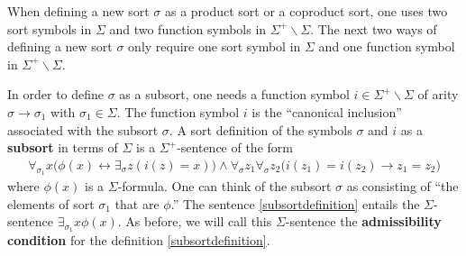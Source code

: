 When defining a new sort $\sigma$ as a product sort or a coproduct
sort, one uses two sort symbols in $\Sigma$ and two function symbols
in $\Sigma^+\backslash\Sigma$. The next two ways of defining a new
sort $\sigma$ only require one sort symbol in $\Sigma$ and one
function symbol in $\Sigma^+\backslash\Sigma$.

\begin{tomt} In order to define $\sigma$ as a subsort, one needs a
  function symbol $i\in\Sigma^+\backslash\Sigma$ of arity
  $\sigma\rightarrow\sigma_1$ with $\sigma_1\in\Sigma$. The function
  symbol $i$ is the ``canonical inclusion'' associated with the
  subsort $\sigma$.  A sort definition of the symbols $\sigma$ and $i$
  as a \textbf{subsort} in terms of $\Sigma$ is a $\Sigma^+$-sentence
  of the form
\begin{gather}
\label{subsortdefinition}
\forall_{\sigma_1}x\big(\phi(x)\leftrightarrow\exists_\sigma
z(i(z)=x)\big) \land\forall_\sigma z_1\forall_\sigma
z_2\big(i(z_1)=i(z_2)\rightarrow z_1=z_2\big)
\end{gather}
where $\phi(x)$ is a $\Sigma$-formula. One can think of the subsort
$\sigma$ as consisting of ``the elements of sort $\sigma_1$ that are
$\phi$.'' The sentence \eqref{subsortdefinition} entails the
$\Sigma$-sentence $\exists_{\sigma_1} x \phi(x)$. As before, we will
call this $\Sigma$-sentence the \textbf{admissibility condition} for
the definition \eqref{subsortdefinition}. \end{tomt}

